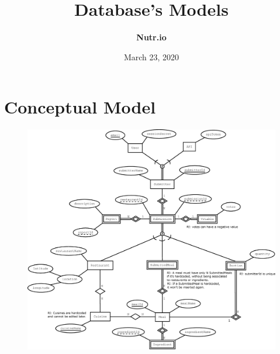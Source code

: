 \documentclass{article}
\title{\textbf{Database's Models}}
\date{March 23, 2020}
\author{\textbf{Nutr.io}}
\begin{document}
\maketitle

\section{Conceptual Model}

\begin{figure}[H]
    \includegraphics[scale=0.33]{Nutr.io_Database_Diagram.eps}
    \centering 
\end{figure}
\newpage
\end{document}
